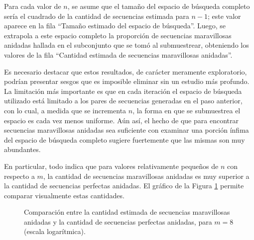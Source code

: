 Para cada valor de $n$, se asume que el tamaño del espacio de búsqueda completo
sería el cuadrado de la cantidad de secuencias estimada para $n - 1$; este
valor aparece en la fila ``Tamaño estimado del espacio de búsqueda''. Luego,
se extrapola a este espacio completo la proporción de secuencias maravillosas
anidadas hallada en el subconjunto que se tomó al submuestrear, obteniendo
los valores de la fila ``Cantidad estimada de secuencias maravillosas
anidadas''.

Es necesario destacar que estos resultados, de carácter meramente exploratorio,
podrían presentar sesgos que es imposible eliminar sin un estudio más profundo.
La limitación más importante es que en cada iteración el espacio de búsqueda
utilizado está limitado a los pares de secuencias generadas en el paso anterior,
con lo cual, a medida que se incrementa $n$, la forma en que se submuestrea el
espacio es cada vez menos uniforme. Aún así, el hecho de que para encontrar
secuencias maravillosas anidadas sea suficiente con examinar una porción ínfima
del espacio de búsqueda completo sugiere fuertemente que las mismas son muy
abundantes.

En particular, todo indica que para valores relativamente pequeños de
$n$ con respecto a $m$, la cantidad de secuencias maravillosas anidadas es
muy superior a la cantidad de secuencias perfectas anidadas. El gráfico
de la Figura \ref{figure:compare-marvellous-perfect} permite comparar
visualmente estas cantidades.

\begin{figure}[H]
	\centering
	\caption{Comparación entre la cantidad estimada de secuencias maravillosas
	anidadas y la cantidad de secuencias perfectas anidadas, para $m = 8$
	(escala logarítmica).}
	\label{figure:compare-marvellous-perfect}
\end{figure}
